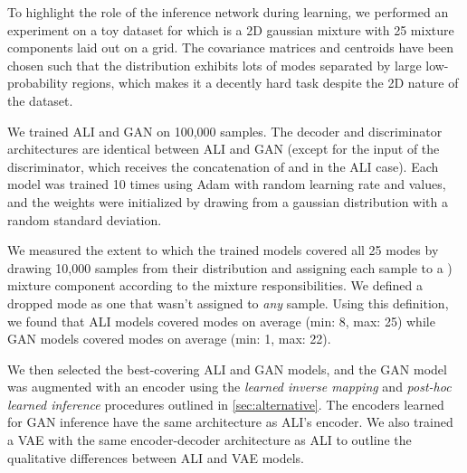 \documentclass{article}
\begin{document}
To highlight the role of the inference network during learning, we performed an
experiment on a toy dataset for which  is a 2D gaussian mixture with
25 mixture components laid out on a grid. The covariance matrices and centroids
have been chosen such that the distribution exhibits lots of modes separated by
large low-probability regions, which makes it a decently hard task despite the
2D nature of the dataset.

We trained ALI and GAN on 100,000  samples. The decoder and
discriminator architectures are identical between ALI and GAN (except for the
input of the discriminator, which receives the concatenation of  and
 in the ALI case). Each model was trained 10 times using Adam
\citep{kingma2014adam} with random learning rate and  values, and the
weights were initialized by drawing from a gaussian distribution with a random
standard deviation.

We measured the extent to which the trained models covered all 25 modes by
drawing 10,000 samples from their  distribution and assigning each
sample to a ) mixture component according to the mixture
responsibilities. We defined a dropped mode as one that wasn’t assigned to {\em
any} sample. Using this definition, we found that ALI models covered  modes on average (min: 8, max: 25) while GAN models covered 
modes on average (min: 1, max: 22).

We then selected the best-covering ALI and GAN models, and the GAN model was
augmented with an encoder using the {\em learned inverse mapping} and {\em
post-hoc learned inference} procedures outlined in \autoref{sec:alternative}.
The encoders learned for GAN inference have the same architecture as ALI’s
encoder.  We also trained a VAE with the same encoder-decoder architecture as
ALI to outline the qualitative differences between ALI and VAE models.
\end{document}

